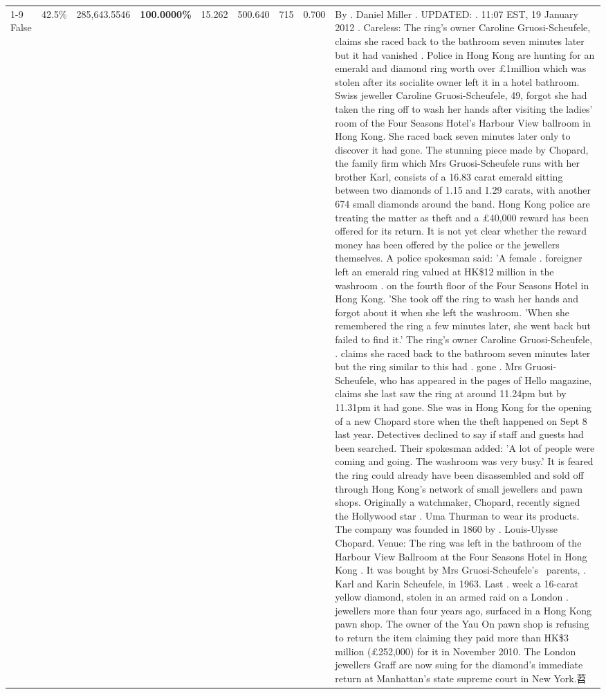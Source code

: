 \begin{table}[H]
\begin{tabular}{lllrlllll}
\cline{1-9}
False & 42.5\% & 285,643.5546 & \bfseries \color{red} 100.0000\% & 15.262 & 500.640 & 715 & 0.700 & By . Daniel Miller . UPDATED: . 11:07 EST, 19 January 2012 . Careless: The ring's owner Caroline Gruosi-Scheufele, claims she raced back to the bathroom seven minutes later but it had vanished . Police in Hong Kong are hunting for an emerald and diamond ring worth over £1million which was stolen after its socialite owner left it in a hotel bathroom. Swiss jeweller Caroline Gruosi-Scheufele, 49, forgot she had taken the ring off to wash her hands after visiting the ladies' room of the Four Seasons Hotel's Harbour View ballroom in Hong Kong. She raced back seven minutes later only to discover it had gone. The stunning piece made by Chopard, the family firm which Mrs Gruosi-Scheufele runs with her brother Karl, consists of a 16.83 carat emerald sitting between two diamonds of 1.15 and 1.29 carats, with another 674 small diamonds around the band. Hong Kong police are treating the matter as theft and a £40,000 reward has been offered for its return. It is not yet clear whether the reward money has been offered by the police or the jewellers themselves. A police spokesman said: 'A female . foreigner left an emerald ring valued at HK\$12 million in the washroom . on the fourth floor of the Four Seasons Hotel in Hong Kong. 'She took off the ring to wash her hands and forgot about it when she left the washroom. 'When she remembered the ring a few minutes later, she went back but failed to find it.' The ring's owner Caroline Gruosi-Scheufele, . claims she raced back to the bathroom seven minutes later but the ring similar to this had . gone . Mrs Gruosi-Scheufele, who has appeared in the pages of Hello magazine, claims she last saw the ring at around 11.24pm but by 11.31pm it had gone. She was in Hong Kong for the opening of a new Chopard store when the theft happened on Sept 8 last year. Detectives declined to say if staff and guests had been searched. Their spokesman added: 'A lot of people were coming and going. The washroom was very busy.' It is feared the ring could already have been disassembled and sold off through Hong Kong's network of small jewellers and pawn shops. Originally a watchmaker, Chopard, recently signed the Hollywood star . Uma Thurman to wear its products. The company was founded in 1860 by . Louis-Ulysse Chopard. Venue: The ring was left in the bathroom of the Harbour View Ballroom at the Four Seasons Hotel in Hong Kong . It was bought by Mrs Gruosi-Scheufele's  parents, . Karl and Karin Scheufele, in 1963. Last . week a 16-carat yellow diamond, stolen in an armed raid on a London . jewellers more than four years ago, surfaced in a Hong Kong pawn shop. The owner of the Yau On pawn shop is refusing to return the item claiming they paid more than HK\$3 million (£252,000) for it in November 2010. The London jewellers Graff are now suing for the diamond’s immediate return at Manhattan’s state supreme court in New York.苕 \\

\end{tabular}
\end{table}
